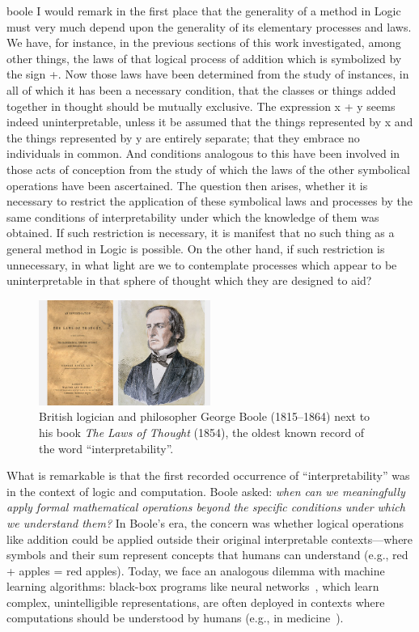 \begin{displaycquote}[p.~48]{boole}
I would remark in the first place that the generality of a method in Logic
must very much depend upon the generality of its elementary processes and laws.
We have, for instance, in the previous sections of this work investigated, among
other things, the laws of that logical process of addition which is symbolized by
the sign +. Now those laws have been determined from the study of instances,
in all of which it has been a necessary condition, that the classes or things added
together in thought should be mutually exclusive. The expression x + y seems
indeed uninterpretable, unless it be assumed that the things represented by x
and the things represented by y are entirely separate; that they embrace no
individuals in common. And conditions analogous to this have been involved
in those acts of conception from the study of which the laws of the other
symbolical operations have been ascertained. The question then arises, whether
it is necessary to restrict the application of these symbolical laws and processes
by the same conditions of interpretability under which the knowledge of them
was obtained. If such restriction is necessary, it is manifest that no such thing
as a general method in Logic is possible. On the other hand, if such restriction
is unnecessary, in what light are we to contemplate processes which appear to
be uninterpretable in that sphere of thought which they are designed to aid?
\end{displaycquote}

\begin{figure}[htbp]
    \centering
    \includegraphics[width=0.5\textwidth]{images/images_intro/gboole.jpg}
    \caption{British logician and philosopher George Boole (1815--1864) next to his book \textit{The Laws of Thought} (1854), the oldest known record of the word ``interpretability''.}
    \label{fig:george-boole}
\end{figure}

What is remarkable is that the first recorded occurrence of ``interpretability'' was in the context of logic and computation. Boole asked: \textit{when can we meaningfully apply formal mathematical operations beyond the specific conditions under which we understand them?}
In Boole's era, the concern was whether logical operations like addition could be applied outside their original interpretable contexts—where symbols and their sum represent concepts that humans can understand (e.g., red + apples = red apples). Today, we face an analogous dilemma with machine learning algorithms: black-box programs like neural networks~\cite{perceptron}, which learn complex, unintelligible representations, are often deployed in contexts where computations should be understood by humans (e.g., in medicine~\cite{black-box2}). 

